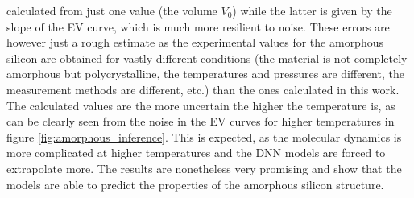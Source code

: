 calculated from just one value (the volume $V_0$) while the latter is given by
the slope of the EV curve, which is much more resilient to noise. These errors
are however just a rough estimate as the experimental values for the amorphous
silicon are obtained for vastly different conditions (the material is not
completely amorphous but polycrystalline, the temperatures and pressures are
different, the measurement methods are different, etc.) than the ones
calculated in this work. The calculated values are the more uncertain the
higher the temperature is, as can be clearly seen from the noise in the EV
curves for higher temperatures in figure \ref{fig:amorphous_inference}. This
is expected, as the molecular dynamics is more complicated at higher
temperatures and the DNN models are forced to extrapolate more. The results
are nonetheless very promising and show that the models are able to predict
the properties of the amorphous silicon structure.
